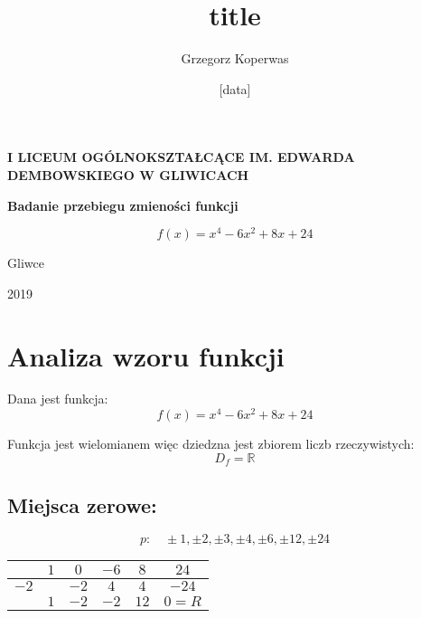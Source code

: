 \documentclass[a4paper,12pt]{article}
\title{title}
\author{Grzegorz Koperwas}
\date{[data]}
\begin{document}
\begin{titlepage}
	\begin{center}
		\Large{\textbf{I LICEUM OGÓLNOKSZTAŁCĄCE IM. EDWARDA DEMBOWSKIEGO W GLIWICACH}}

		\vspace{3cm}

		\theauthor

		\vspace{2.5cm}

		\textbf{Badanie przebiegu zmieności funkcji}

		\[f \left( x \right) = x^4 - 6x^2 + 8x + 24 \]

		\vfill

		Gliwce
		\vspace{0.5cm}

		\titlerule
		\vspace{0.6cm}

		2019

	\end{center}

\end{titlepage}

\section{Analiza wzoru funkcji}

Dana jest funkcja:
\[ f \left( x \right) = x^4  - 6x^2 + 8x + 24 \]

Funkcja jest wielomianem więc dziedzna jest zbiorem liczb rzeczywistych:
\[D_f = \mathbb{R} \]

\subsection{Miejsca zerowe:}
\[ p: \quad \pm 1, \pm 2, \pm 3, \pm 4, \pm 6, \pm 12, \pm 24\]

\begin{center}
	
\begin{tabular}{l|c|c|c|c|c|}

\cline{2-6}

                           & $1$ & $0$  & $-6$ & $8$  & $24$    \\ \hline

\multicolumn{1}{|l|}{$-2$} &     & $-2$ & $4$  & $4$  & $-24$   \\ \hline

                           & $1$ & $-2$ & $-2$ & $12$ & $0 = R$ \\ \cline{2-6} 

\end{tabular}
\end{center}
\end{document}
